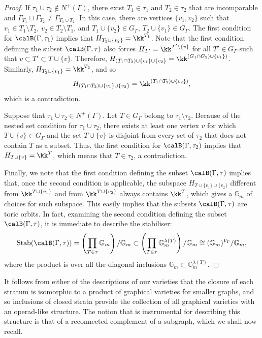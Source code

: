 \begin{proof}
If $\tau_1\cup \tau_2\notin N^+(\Gamma)$, there exist $T_1\in\tau_1$ and $T_2\in\tau_2$ that are incomparable and $\Gamma_{T_1}\sqcup \Gamma_{T_2}\neq\Gamma_{T_1\cup T_2}$. In this case, there are vertices $\{v_1,v_2\}$ such that $v_1\in T_1\setminus T_2$, $v_2\in T_2\setminus T_1$, and $T_1\cup\{v_2\}\in G_\Gamma$, $T_2\cup \{v_1\}\in G_\Gamma$. The first condition for $\calB(\Gamma,\tau_1)$ implies that $H_{T_1\cup\{v_2\}}=\kk^{T_1}$. Note that the first condition defining the subset $\calB(\Gamma,\tau)$ also forces $H_{T'}=\kk^{T'\setminus\{v\}}$ for all $T'\in G_\Gamma$ such that $v\subset T'\subset T\cup\{v\}$. Therefore, $H_{(T_1\cap T_2)\cup\{v_1\}\cup\{v_2\}}=\kk^{(G_1\cap G_2)\cup \{v_1\})}$. Similarly, $H_{T_2\cup\{v_1\}}= \kk^{T_2}$, and so 
 \[
H_{(T_1\cap T_2)\cup\{v_1\} \cup  \{v_2\}}=\kk^{(T_1\cap T_2)\cup\{v_2\})},
 \] 
which is a contradiction.

Suppose that $\tau_1\cup\tau_2\in N^+(\Gamma)$. Let $T\in G_\Gamma$ belong to $\tau_1\setminus\tau_2$. Because of the nested set condition for $\tau_1\cup\tau_2$, there exists at least one vertex $v$ for which $T\cup\{v\}\in G_\Gamma$ and the set $T\cup\{v\}$ is disjoint from every set of $\tau_2$ that does not contain $T$ as a subset. Thus, the first condition for $\calB(\Gamma,\tau_2)$ implies that $H_{T\cup\{v\}}=\kk^{T}$, which means that $T\in \tau_2$, a contradiction.  

Finally, we note that the first condition defining the subset $\calB(\Gamma,\tau)$ implies that, once the second condition is applicable, the subspace $H_{T\cup\{v_1\}\cup\{v_2\}}$ different from $\kk^{T\cup\{v_1\}}$ and from $\kk^{T\cup\{v_2\}}$ always contains $\kk^{T}$, which gives a $\mathbb{G}_m$ of choices for such subspace. This easily implies that the subsets $\calB(\Gamma,\tau)$ are toric orbits. In fact, examining the second condition defining the subset $\calB(\Gamma,\tau)$, it is immediate to describe the stabiliser:
 \[
\mathrm{Stab}(\calB(\Gamma,\tau))=\left(\prod_{T\in\tau} \mathbb{G}_m\right)/\mathbb{G}_m\subset
\left(\prod_{T\in\tau} \mathbb{G}_m^{\lambda(T)}\right)/\mathbb{G}_m\cong(\mathbb{G}_m)^{V_\Gamma}/\mathbb{G}_m,
 \]
where the product is over all the diagonal inclusions $\mathbb{G}_m\subset\mathbb{G}_m^{\lambda(T)}$.
\end{proof}

It follows from either of the descriptions of our varieties that the closure of each stratum is isomorphic to a product of graphical varieties for smaller graphs, and so inclusions of closed strata provide the collection of all graphical varieties with an operad-like structure. The notion that is instrumental for describing this structure is that of a reconnected complement of a subgraph, which we shall now recall.

